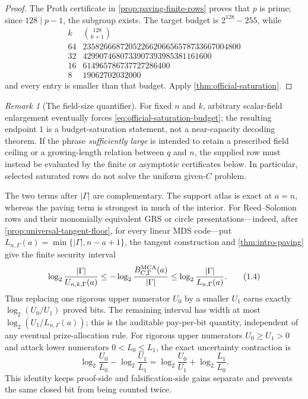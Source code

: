 \documentclass[11pt,a4paper]{amsart}
\numberwithin{equation}{section}
\theoremstyle{remark}
\newtheorem{remark}[remark]{Remark}
\newcommand{\abs}[1]{\lvert #1\rvert}
\begin{document}
\begin{proof}
The Proth certificate in \cref{prop:paving-finite-rows} proves that \(p\)
is prime; since \(128\mid p-1\), the subgroup exists.  The target budget is
\(2^{128}-255\), while
\[
\begin{array}{c|r}
k&\binom{128}{k+1}\\ \hline
64&23582666872052266206656578733667004800\\
32&4299074680733907393985381161600\\
16&614965786737727286400\\
8 &19062702032000
\end{array}
\]
and every entry is smaller than that budget.  Apply
\cref{thm:official-saturation}.
\end{proof}

\begin{remark}[The field-size quantifier]
\label{rem:official-field-size-quantifier}
For fixed \(n\) and \(k\), arbitrary scalar-field enlargement eventually
forces \eqref{eq:official-saturation-budget}; the resulting endpoint \(1\) is a
budget-saturation statement, not a near-capacity decoding theorem.  If the
phrase \emph{sufficiently large} is intended to retain a prescribed field
ceiling or a growing-length relation between \(q\) and \(n\), the supplied row
must instead be evaluated by the finite or asymptotic certificates below.  In
particular, selected saturated rows do not solve the uniform given-\(C\)
problem.
\end{remark}

The two terms after \(\abs\Gamma\) are complementary.  The support atlas is
exact at \(a=n\), whereas the paving term is strongest in much of the
interior.  For Reed--Solomon rows and their monomially equivalent GRS or
circle presentations---indeed, after \cref{prop:universal-tangent-floor},
for every linear MDS code---put
\(L_{n,\Gamma}(a)=\min\{\abs\Gamma,n-a+1\}\), the tangent construction and
\cref{thm:intro-paving} give the finite security interval
\[
 \log_2\frac{\abs\Gamma}{U_{n,k,\Gamma}(a)}
 \le -\log_2\frac{B_{C,\Gamma}^{\rm MCA}(a)}{\abs\Gamma}
 \le\log_2\frac{\abs\Gamma}{L_{n,\Gamma}(a)}.       \tag{1.4}
 \label{eq:intro-security-interval}
\]
Thus replacing one rigorous upper numerator \(U_0\) by a smaller \(U_1\)
earns exactly \(\log_2(U_0/U_1)\) proved bits.  The remaining interval has
width at most \(\log_2(U_1/L_{n,\Gamma}(a))\); this is the auditable
pay-per-bit quantity, independent of any eventual prize-allocation rule.
For rigorous upper numerators \(U_0\ge U_1>0\) and attack lower numerators
\(0<L_0\le L_1\), the exact uncertainty contraction is
\[
 \log_2\frac{U_0}{L_0}-\log_2\frac{U_1}{L_1}
 =\log_2\frac{U_0}{U_1}+\log_2\frac{L_1}{L_0}.     \tag{SG}
\]
This identity keeps proof-side and falsification-side gains separate and
prevents the same closed bit from being counted twice.
\end{document}

